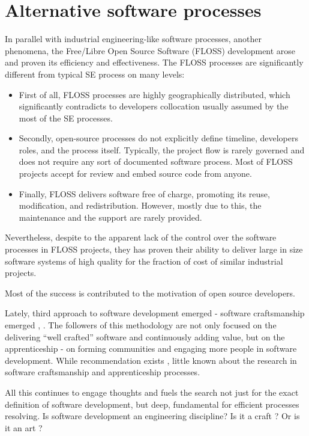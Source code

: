 \section{Alternative software processes}
In parallel with industrial engineering-like software processes, another phenomena, the Free/Libre Open 
Source Software (FLOSS) development arose and proven its efficiency and effectiveness.
The FLOSS processes are significantly different from typical SE process on many levels:
\begin{itemize}
 \item First of all, FLOSS processes are highly geographically distributed, which significantly contradicts 
 to developers collocation usually assumed by the most of the SE processes. 
 \item Secondly, open-source processes do not explicitly define timeline, developers roles, and 
 the process itself. Typically, the project flow is rarely governed and does not require any sort of 
 documented software process. Most of FLOSS projects accept for review and embed source code from anyone.
 \item Finally, FLOSS delivers software free of charge, promoting its reuse, modification, and redistribution.
 However, mostly due to this, the maintenance and the support are rarely provided.
\end{itemize}

Nevertheless, despite to the apparent lack of the control over the software processes in FLOSS projects, they 
has proven their ability to deliver large in size software systems of high quality for the fraction of cost 
of similar industrial projects.

Most of the success is contributed to the motivation of open source developers.

Lately, third approach to software development emerged - software craftsmanship emerged 
\cite{citeulike:11058561}, \cite{citeulike:11058554}. The followers of this methodology 
are not only focused on the delivering ``well crafted'' software and continuously adding value,
but on the apprenticeship - on forming communities and engaging more people in software development.
While recommendation exists \cite{citeulike:11058784}, little known about the research 
in software craftsmanship and apprenticeship processes.

All this continues to engage thoughts and fuels the search not just for the exact definition 
of software development, but deep, fundamental for efficient processes resolving. 
Is software development an engineering discipline? Is it a craft \cite{citeulike:5203446}? 
Or is it an art \cite{citeulike:11045694}?

